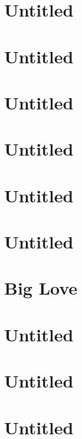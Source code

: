 \documentclass[oneside,14pt]{memoir} %
\newcommand{\chapterXXIXvar}{poem/untitled_8.tex}
\newcommand{\chapterXXXvar}{poem/untitled_9.tex}
\newcommand{\chapterXXXIvar}{poem/untitled_10.tex}
\newcommand{\chapterXXXIIvar}{poem/untitled_11.tex}
\newcommand{\chapterXXXIIIvar}{poem/untitled_12.tex}
\newcommand{\chapterXXXIVvar}{poem/untitled_13.tex}
\newcommand{\chapterXXXVvar}{poem/big_love.tex}
\newcommand{\chapterXXXVIvar}{poem/untitled_14.tex}
\newcommand{\chapterXXXVIIIvar}{poem/scenery_tiles.tex}
\begin{document}
\chapter{Untitled}


\chapter{Untitled}


\chapter{Untitled}


\chapter{Untitled}


\chapter{Untitled}


\chapter{Untitled}


\chapter{Big Love}


\chapter{Untitled}


\chapter{Untitled}


\chapter{Untitled}




\end{document}
